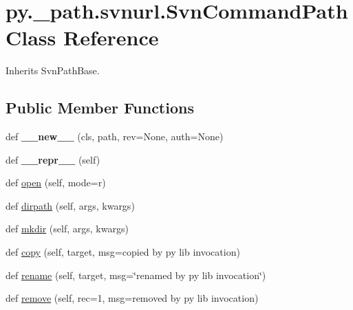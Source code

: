 \hypertarget{classpy_1_1__path_1_1svnurl_1_1_svn_command_path}{}\section{py.\+\_\+path.\+svnurl.\+Svn\+Command\+Path Class Reference}
\label{classpy_1_1__path_1_1svnurl_1_1_svn_command_path}


Inherits Svn\+Path\+Base.

\subsection*{Public Member Functions}
\begin{DoxyCompactItemize}
\item 
\mbox{\label{classpy_1_1__path_1_1svnurl_1_1_svn_command_path_ac54ac68fd066b73ff5d33d5e89762aac}} 
def {\bfseries \+\_\+\+\_\+new\+\_\+\+\_\+} (cls, path, rev=None, auth=None)
\item 
\mbox{\label{classpy_1_1__path_1_1svnurl_1_1_svn_command_path_ab291ce79a949ede391c39555907bdd46}} 
def {\bfseries \+\_\+\+\_\+repr\+\_\+\+\_\+} (self)
\item 
def \hyperlink{classpy_1_1__path_1_1svnurl_1_1_svn_command_path_a66e970e14d18e617b26b7f95718233db}{open} (self, mode=\textquotesingle{}r\textquotesingle{})
\item 
def \hyperlink{classpy_1_1__path_1_1svnurl_1_1_svn_command_path_a56514d25aea1ebc54e20fabac10b98f2}{dirpath} (self, args, kwargs)
\item 
def \hyperlink{classpy_1_1__path_1_1svnurl_1_1_svn_command_path_a3d92713c05b9a68cd4ef4ffad5d56bd0}{mkdir} (self, args, kwargs)
\item 
def \hyperlink{classpy_1_1__path_1_1svnurl_1_1_svn_command_path_aa24a5d520b9506e99516a6f40b4f8c20}{copy} (self, target, msg=\textquotesingle{}copied by py lib invocation\textquotesingle{})
\item 
def \hyperlink{classpy_1_1__path_1_1svnurl_1_1_svn_command_path_a6cc47cfdd362d1c6ef80029cacefc174}{rename} (self, target, msg=\char`\"{}renamed by py lib invocation\char`\"{})
\item 
def \hyperlink{classpy_1_1__path_1_1svnurl_1_1_svn_command_path_a0659be1acadcbb206fe24d69587c5327}{remove} (self, rec=1, msg=\textquotesingle{}removed by py lib invocation\textquotesingle{})

\end{DoxyCompactItemize}
